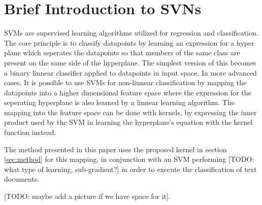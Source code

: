 \section{Brief Introduction to SVNs} \label{sec:background}
SVMs are supervised learning algorithms utilized for regression and classification. The core principle is to classify datapoints by learning an expression for a hyper plane which seperates the datapoints so that members of the same class are present on the same side of the hyperplane. The simplest version of this becomes a binary linnear classifier applied to datapoints in input space. In more advanced cases, It is possible to use SVMs for non-linnear classification by mapping the datapoints into a higher dimensional feature space where the expression for the seperating hyperplane is also learned by a linnear learning algorithm. The mapping into the feature space can be done with kernels, by expressing the inner product used by the SVM in learning the hyperplane's equation with the kernel function instead.  

The method presented in this paper uses the proposed kernel in section \ref{sec:method} for this mapping, in conjunction with an SVM performing [TODO: what type of learning, sub-gradient?] in order to execute the classification of text documents. 

[TODO: maybe add a picture if we have space for it].

